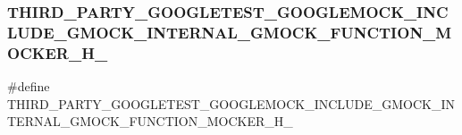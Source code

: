 \subsubsection{\texorpdfstring{THIRD\_PARTY\_GOOGLETEST\_GOOGLEMOCK\_INCLUDE\_GMOCK\_INTERNAL\_GMOCK\_FUNCTION\_MOCKER\_H\_}{THIRD\_PARTY\_GOOGLETEST\_GOOGLEMOCK\_INCLUDE\_GMOCK\_INTERNAL\_GMOCK\_FUNCTION\_MOCKER\_H\_}}
{\footnotesize\ttfamily \#define T\+H\+I\+R\+D\+\_\+\+P\+A\+R\+T\+Y\+\_\+\+G\+O\+O\+G\+L\+E\+T\+E\+S\+T\+\_\+\+G\+O\+O\+G\+L\+E\+M\+O\+C\+K\+\_\+\+I\+N\+C\+L\+U\+D\+E\+\_\+\+G\+M\+O\+C\+K\+\_\+\+I\+N\+T\+E\+R\+N\+A\+L\+\_\+\+G\+M\+O\+C\+K\+\_\+\+F\+U\+N\+C\+T\+I\+O\+N\+\_\+\+M\+O\+C\+K\+E\+R\+\_\+\+H\+\_\+}

